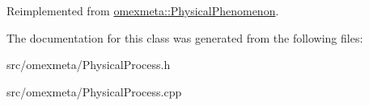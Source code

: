 Reimplemented from \hyperlink{classomexmeta_1_1PhysicalPhenomenon_a30617e685bd8b155a76d38ab5a9db273}{omexmeta\+::\+Physical\+Phenomenon}.



The documentation for this class was generated from the following files\+:\begin{DoxyCompactItemize}
\item 
src/omexmeta/Physical\+Process.\+h\item 
src/omexmeta/Physical\+Process.\+cpp\end{DoxyCompactItemize}
